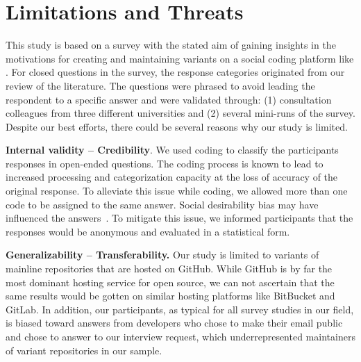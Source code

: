 \section{Limitations and Threats}
This study is based on a survey with the stated aim of gaining insights
in the motivations for creating and maintaining variants on a social coding platform like \gh.
For closed questions in the survey, the response categories originated from our review of the literature.
The questions were phrased to avoid leading the respondent to a specific answer and were validated through: (1) consultation colleagues from three different universities and (2) several mini-runs of the survey. Despite our best efforts, there could be several reasons why our study is limited.

\noindent \textbf{Internal validity -- Credibility}. We used coding to classify the participants responses in open-ended questions. The coding process is known to lead to increased processing and categorization capacity at the loss of accuracy of the original response. To alleviate this issue while coding, we allowed more than one code to be assigned to the same answer. 
Social desirability bias may have influenced the answers~\cite{Furnham:1986}. To mitigate this issue, we informed participants that the responses would be anonymous and evaluated in a statistical form.

\noindent \textbf{Generalizability – Transferability.} Our study is limited to variants of mainline repositories that are hosted on GitHub. While GitHub is by far the most dominant hosting service for open source, we can not ascertain that the same results would be gotten on similar hosting platforms like BitBucket and GitLab.
In addition, our participants, as typical for all survey studies in our field, is biased toward answers from developers who chose to make their email public and chose to answer to our interview request, which underrepresented maintainers of variant repositories in our sample.

